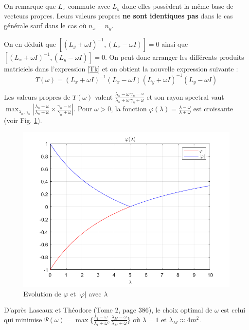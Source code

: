 \documentclass{article}
\begin{document}
On remarque que $L_x$ commute avec $L_y$ donc elles possèdent la même base de vecteurs propres.
Leurs valeurs propres {\bf ne sont identiques pas} dans le cas générale sauf dans le cas où $n_x=n_y$.

On en déduit que $[ (L_y+\omega I)^{-1}, (L_x-\omega I) ]=0$ ainsi que 
$ [(L_x+\omega I)^{-1}, (L_y-\omega I)]=0$.
On peut donc arranger les différents produits matriciels dans l'expression \ref{Tk} et on obtient
la nouvelle expression suivante :
\begin{equation}
T(\omega) =(L_x+\omega I)^{-1}  (L_x-\omega I)    (L_y+\omega I)^{-1} (L_y-\omega I)  
 \label{Tomega}
\end{equation}

Les valeurs propres de $T(\omega)$ valent $\frac{\lambda_n-\omega}{\lambda_n+\omega}  
\frac{\gamma_n-\omega}{\gamma_n+\omega}$ et son rayon spectral vaut $
\max_{\lambda_n, \gamma_n} \left| \frac{\lambda_n-\omega}{\lambda_n+\omega}  \times
\frac{\gamma_n-\omega}{\gamma_n+\omega} \right|$.
Pour $\omega>0$, la fonction $\varphi(\lambda) = \frac{\lambda-\omega}{\lambda+\omega}$
est croissante (voir Fig. \ref{phi}).

\begin{figure}[h!]
 \centering
\includegraphics[scale=0.5]{phi_lambda.png}
\caption{Evolution de $\varphi$ et $|\varphi|$ avec $\lambda$}
\label{phi}
\end{figure}

\noindent
D'après Lascaux et Théodore (Tome 2, page 386),
le choix optimal de $\omega$ est celui qui minimise $\Psi(\omega)=\max \{ 
 \frac{\lambda_1-\omega}{\lambda_1+\omega},  \frac{\lambda_M-\omega}{\lambda_M+\omega} \}$
 où $\lambda=1$ et $\lambda_M \approx 4 m^2$.
 
\end{document}
